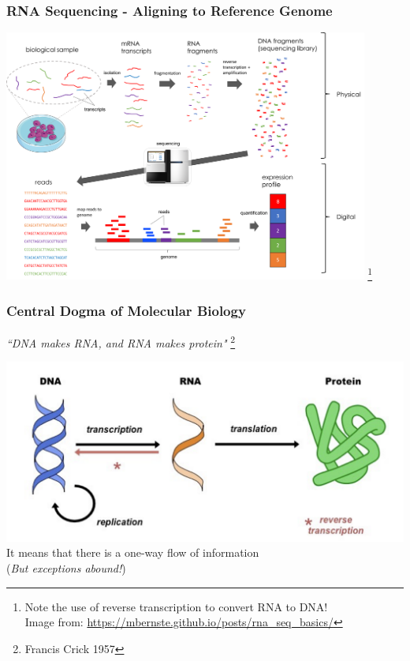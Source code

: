 \documentclass{beamer}
\newcommand\blfootnote[1]{%
	\begingroup
	\renewcommand\thefootnote{}\footnote{#1}%
	\addtocounter{footnote}{-1}%
	\endgroup
}
\begin{document}
\begin{frame}
	\frametitle{RNA Sequencing - Aligning to Reference Genome}
	\centering	\includegraphics[keepaspectratio, width  = 0.9\textwidth]{img/RNA_seq}
	\blfootnote{Note the use of reverse transcription to convert RNA to DNA!\\ Image from: \url{https://mbernste.github.io/posts/rna_seq_basics/}}
\end{frame}



\begin{frame}
	\frametitle{Central Dogma of Molecular Biology}
	
	
	\centering	\Large \textit{``DNA makes RNA, and RNA makes protein"} \blfootnote{Francis Crick 1957}
	
	\centering	\includegraphics[keepaspectratio, width  = \textwidth]{img/dogma}\\ 
	
	\scriptsize \centering	It means that there is a one-way flow of information \\(\textit{But exceptions abound!})
	
\end{frame}
\end{document}
